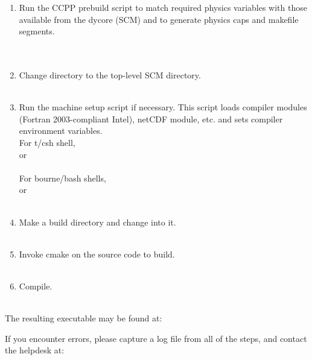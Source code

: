 \begin{enumerate}
	\item Run the CCPP prebuild script to match required physics variables with those available from the dycore (SCM) and to generate physics caps and makefile segments.\\
   \\
  \\

	\item Change directory to the top-level SCM directory.\\
   \\
	\item Run the machine setup script if necessary. This script loads compiler modules (Fortran 2003-compliant Intel), netCDF module, etc. and sets compiler environment variables.  \\
For t/csh shell, \\
   or\\
  \\

For bourne/bash shells,\\
   or\\
  \\

	\item Make a build directory and change into it.  \\
  \\

	\item Invoke cmake on the source code to build.  \\
  \\
	\item Compile.  \\
  \\

\end{enumerate}

The resulting executable may be found at: 


If you encounter errors, please capture a log file from all of the steps, and contact the helpdesk at: 


